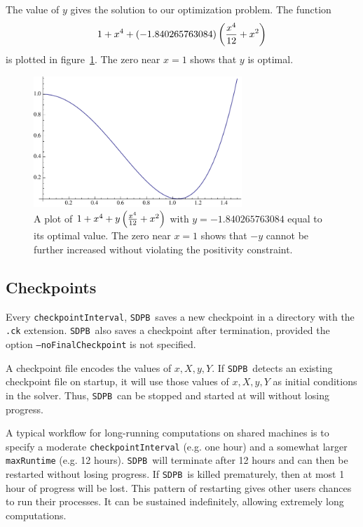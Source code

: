 \documentclass[12pt]{article}
\numberwithin{equation}{section}
\renewcommand{\be}{\begin{eqnarray}}
\renewcommand{\ee}{\end{eqnarray}}
\newcommand\SDPB{\texttt{SDPB}}
\begin{document}
The value of $y$ gives the solution to our optimization problem.  The function
\be
1+x^4 + (-1.840265763084)\p{\frac{x^4}{12} + x^2}
\ee
is plotted in figure~\ref{fig:plot}.  The zero near $x=1$ shows that $y$ is optimal.

\begin{figure}
\begin{center}
\includegraphics[width=0.7\textwidth]{optimizationplot}
\end{center}
\caption{A plot of $1+x^4 + y\left ( \frac{x^4}{12} + x^2 \right )$ with $y=-1.840265763084$ equal to its optimal value.  The zero near $x=1$ shows that $-y$ cannot be further increased without violating the positivity constraint.}
\label{fig:plot}
\end{figure}

\subsection{Checkpoints}

Every \texttt{checkpointInterval}, \SDPB\ saves a new checkpoint in a directory with the \texttt{.ck} extension.  \SDPB\ also saves a checkpoint after termination, provided the option \newline
\texttt{--noFinalCheckpoint} is not specified.  

A checkpoint file encodes the values of $x,X,y,Y$.  If \SDPB\ detects an existing checkpoint file on startup, it will use those values of $x,X,y,Y$ as initial conditions in the solver.  Thus, \SDPB\ can be stopped and started at will without losing progress.

A typical workflow for long-running computations on shared machines is to specify a moderate \texttt{checkpointInterval} (e.g. one hour) and a somewhat larger \texttt{maxRuntime} (e.g. 12 hours).  \SDPB\ will terminate after 12 hours and can then be restarted without losing progress.  If \SDPB\ is killed prematurely, then at most 1 hour of progress will be lost.  This pattern of restarting gives other users chances to run their processes.  It can be sustained indefinitely, allowing extremely long computations.
\end{document}
